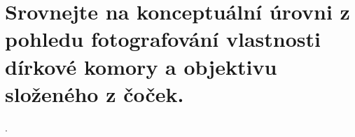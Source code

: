 \section{Srovnejte na konceptuální úrovni z pohledu fotografování vlastnosti dírkové komory a objektivu složeného z 
čoček.}.